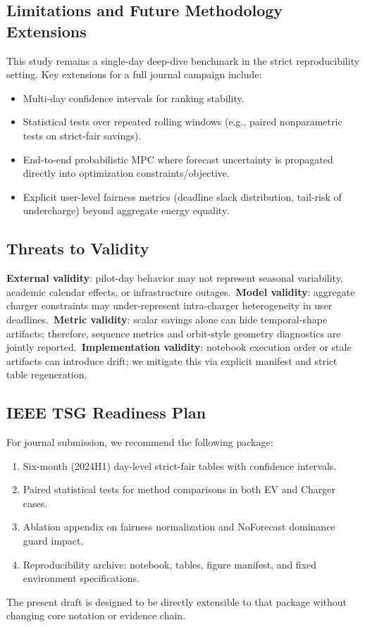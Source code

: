 \documentclass[journal]{IEEEtran}
\begin{document}
\subsection{Limitations and Future Methodology Extensions}
This study remains a single-day deep-dive benchmark in the strict reproducibility setting. Key extensions for a full journal campaign include:
\begin{itemize}
    \item Multi-day confidence intervals for ranking stability.
    \item Statistical tests over repeated rolling windows (e.g., paired nonparametric tests on strict-fair savings).
    \item End-to-end probabilistic MPC where forecast uncertainty is propagated directly into optimization constraints/objective.
    \item Explicit user-level fairness metrics (deadline slack distribution, tail-risk of undercharge) beyond aggregate energy equality.
\end{itemize}

\subsection{Threats to Validity}
\textbf{External validity}: pilot-day behavior may not represent seasonal variability, academic calendar effects, or infrastructure outages.\
\textbf{Model validity}: aggregate charger constraints may under-represent intra-charger heterogeneity in user deadlines.\
\textbf{Metric validity}: scalar savings alone can hide temporal-shape artifacts; therefore, sequence metrics and orbit-style geometry diagnostics are jointly reported.\
\textbf{Implementation validity}: notebook execution order or stale artifacts can introduce drift; we mitigate this via explicit manifest and strict table regeneration.

\subsection{IEEE TSG Readiness Plan}
For journal submission, we recommend the following package:
\begin{enumerate}
    \item Six-month (2024H1) day-level strict-fair tables with confidence intervals.
    \item Paired statistical tests for method comparisons in both EV and Charger cases.
    \item Ablation appendix on fairness normalization and NoForecast dominance guard impact.
    \item Reproducibility archive: notebook, tables, figure manifest, and fixed environment specifications.
\end{enumerate}
The present draft is designed to be directly extensible to that package without changing core notation or evidence chain.
\end{document}
